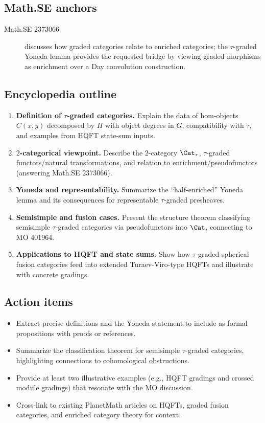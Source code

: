 \subsection*{Math.SE anchors}
\begin{description}
  \item[Math.SE 2373066] discusses how graded categories relate to enriched categories; the $\tau$-graded Yoneda lemma provides the requested bridge by viewing graded morphisms as enrichment over a Day convolution construction.
\end{description}
\subsection*{Encyclopedia outline}
\begin{enumerate}
  \item \textbf{Definition of $\tau$-graded categories.} Explain the data of hom-objects $C(x,y)$ decomposed by $H$ with object degrees in $G$, compatibility with $\tau$, and examples from HQFT state-sum inputs.
  \item \textbf{$2$-categorical viewpoint.} Describe the $2$-category $\Cat_\tau$, $\tau$-graded functors/natural transformations, and relation to enrichment/pseudofunctors (answering Math.SE 2373066).
  \item \textbf{Yoneda and representability.} Summarize the ``half-enriched'' Yoneda lemma and its consequences for representable $\tau$-graded presheaves.
  \item \textbf{Semisimple and fusion cases.} Present the structure theorem classifying semisimple $\tau$-graded categories via pseudofunctors into $\Cat$, connecting to MO 401964.
  \item \textbf{Applications to HQFT and state sums.} Show how $\tau$-graded spherical fusion categories feed into extended Turaev-Viro-type HQFTs and illustrate with concrete gradings.
\end{enumerate}
\subsection*{Action items}
\begin{itemize}
  \item Extract precise definitions and the Yoneda statement to include as formal propositions with proofs or references.
  \item Summarize the classification theorem for semisimple $\tau$-graded categories, highlighting connections to cohomological obstructions.
  \item Provide at least two illustrative examples (e.g., HQFT gradings and crossed module gradings) that resonate with the MO discussion.
  \item Cross-link to existing PlanetMath articles on HQFTs, graded fusion categories, and enriched category theory for context.
\end{itemize}

